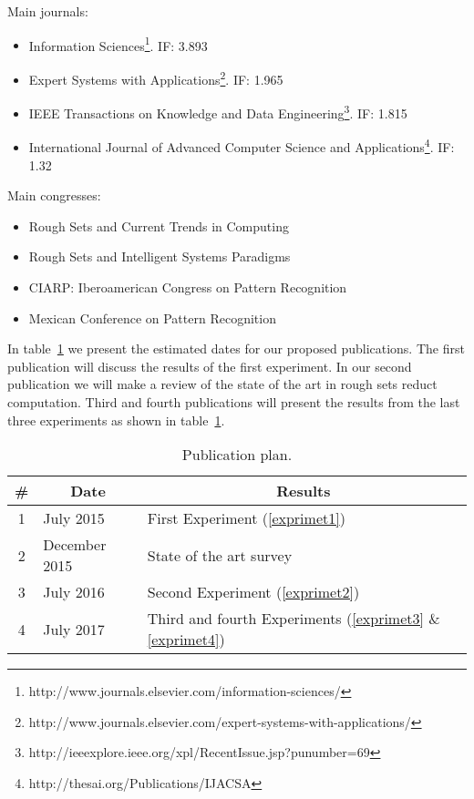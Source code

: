 \documentclass[11pt,authoryear]{elsarticle}
\begin{document}
  Main journals:
  \begin{itemize}
 	\item Information Sciences\footnote{http://www.journals.elsevier.com/information-sciences/}. IF: 3.893
 	\item Expert Systems with 
 		  Applications\footnote{http://www.journals.elsevier.com/expert-systems-with-applications/}. IF: 1.965
 	\item IEEE Transactions on Knowledge and Data
 		  Engineering\footnote{http://ieeexplore.ieee.org/xpl/RecentIssue.jsp?punumber=69}. IF: 1.815
 	\item International Journal of Advanced Computer Science and
 		  Applications\footnote{http://thesai.org/Publications/IJACSA}. IF: 1.32
  \end{itemize}
 
  Main congresses:
  \begin{itemize}
 	\item Rough Sets and Current Trends in Computing
 	\item Rough Sets and Intelligent Systems Paradigms
 	\item CIARP: Iberoamerican Congress on Pattern Recognition
 	\item Mexican Conference on Pattern Recognition
  \end{itemize}
  
  In table~\ref{tab_PP} we present the estimated dates for our proposed publications. The first publication will
  discuss the results of the first experiment. In our second publication we will make a review of the state of 
  the art in rough sets reduct computation. Third and fourth publications will present the results from the last
  three experiments as shown in table~\ref{tab_PP}.
  
     \begin{table}[htb]
		\caption{Publication plan.} \label{tab_PP}
		\centering
 	\begin{tabular}{c||l|l}
 		\# & \multicolumn{1}{c|}{Date} & \multicolumn{1}{c}{Results}\\
 		\hline \hline
		1 & July 2015 & First Experiment (\ref{exprimet1})\\
		2 & December 2015 & State of the art survey \\
		3 & July 2016 & Second Experiment (\ref{exprimet2})\\
		4 & July 2017 & Third and fourth Experiments (\ref{exprimet3} \& \ref{exprimet4})\\
 	\end{tabular}             
 	\end{table}

\newpage 
{}

\end{document}
